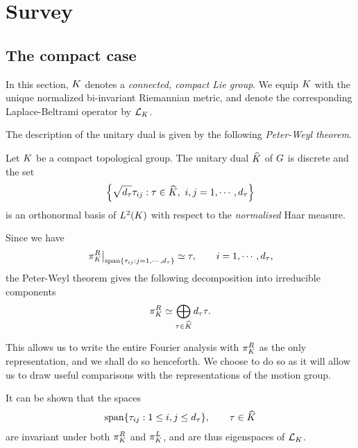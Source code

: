 \chapter{Survey}

\section{The compact case}

In this section,
$\CompactGroup$ denotes a \emph{connected, compact Lie group}.
We equip $\CompactGroup$ with the unique normalized bi-invariant Riemannian metric,
and denote the corresponding Laplace-Beltrami operator by $\Laplacian [\CompactGroup]$.

The description of the unitary dual is given by the following \emph{Peter-Weyl theorem}.

\begin{theorem}
\label{theorem:Peter-Weyl_theorem}
    Let $\CompactGroup$ be a compact topological group.
    The unitary dual $\dualGroup \CompactGroup$ of $\Group$ is discrete and
    the set
    \begin{align*}
        \left\{
            \sqrt{\dimRep\tau} \tau_{ij} : \tau \in \dualGroup\CompactGroup,\ i, j = 1, \cdots, \dimRep\tau
        \right\}
    \end{align*}
    is an orthonormal basis of $\Lebesgue{2}{\CompactGroup}$ with respect to the \emph{normalised} Haar measure.
\end{theorem}

Since we have
\begin{align*}
    \eval \RightRegularRepresentation {\Span \{\tau_{i j} : j = 1, \cdots, \dimRep \tau\}} \simeq \tau,
    \qquad i = 1, \cdots, \dimRep \tau,
\end{align*}
the Peter-Weyl theorem gives the following decomposition into irreducible components
\begin{align*}
    \RightRegularRepresentation \simeq \bigoplus_{\tau \in \dualGroup \CompactGroup} \dimRep \tau \tau.
\end{align*}

This allows us to write the entire Fourier analysis with $\RightRegularRepresentation$ as the only representation,
and we shall do so henceforth.
We choose to do so as it will allow us to draw useful comparisons with the representations of the motion group.

It can be shown that the spaces
\begin{align*}
    \Span \{ \tau_{i j} : 1 \leq i, j \leq \dimRep \tau\}, \qquad \tau \in \dualGroup \CompactGroup
\end{align*}
are invariant under both $\RightRegularRepresentation$ and $\LeftRegularRepresentation$,
and are thus eigenspaces of $\Laplacian [\CompactGroup]$.

